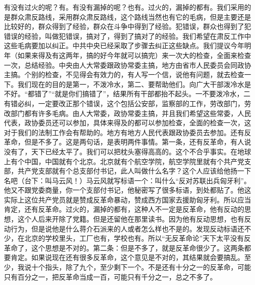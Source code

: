 有没有过火的呢？有。有没有漏掉的呢？也有。过火的，漏掉的都有。我们采用的是群众肃反路线，采用群众肃反路线，这个路线当然也有它的毛病，但是主要还是比较好的，群众得到了经验，群众在斗争中得到了经验。犯错误，群众也得到了犯错误的经验，叫做犯错误，搞对了，得到了搞对了的经验。我们希望在肃反工作中这些毛病要加以纠正。中共中央已经采取了步骤去纠正这些缺点。我们提议今年明年（如果来得及有这两年，搞的好今年就可以搞完）来一次大的检查，全面来检查一次，总结经验。中央由人大常委跟政协常委主搞，地方由省市人民委员会同政协主搞。个别的检查，不见得会有效力的，有人写一个信，说他有问题，就去检查一下。我们现在的目的是第一，不泼冷水，第二、要帮助他们。向广大干部泼冷水是不好。“都错了”“就是你们搞错了”，结果所有干部都抬不起头。一不要泼冷水，二有错必纠，一定要改正那个错误，这个包括公安部，监察部的工作，劳改部门，劳改部门都有许多毛病。由人大常委，政协常委主搞，并且我们希望这些常委，人民代表，政协委员还可以参加，具体来得及的都可以参加检查，全面的检查一次，这对于我们的法制工作会有帮助的。地方有地方人民代表跟政协委员去参加。还有反革命，但是不多了。这是两句话，是表明两件事情。第一条，还有反革命，有人说没有了，天下已经太平了。我们可以把枕头塞得高高的。这个不合乎事实。在地球上有个中国，中国就有个北京。北京就有个航空学院，航空学院里就有个共产党支部，共产党支部就有个总支部付书记，此人叫做什么名字？这个人应该给他扬一下名吧（台下：叫马云风！）马云风就写标语一个：叫什么“反对苏联出兵匈牙利”。他又不跟党委商量，你一个支部付书记，他秘密写了很多标语，到处都贴了。他这实际上这位共产党员就是赞成反革命暴动，赞成西方国家去援助匈牙利。所以应当肯定，还有反革命。过火的，漏掉的都有，这种人不一定是反革命，他有反动的思想，这个人后来开除了党籍。但是还留他在那里读书。因为他有反动思想，也有反动行为，但是说他是什么蒋介石派来的人或者怎么样也不是的。发现反动标语还不少，在北京的学校里头，工厂也有，学校也有。所以“无反革命论”天下太平没有反革命了，这个思想是不对的。第二条：但是不多了，就是反革命很少了。这两条都要肯定。如果说现在还有很多反革命，这个意见是不对的，其结果就会要搞乱。至少，我说十个指头，除了九个，至少剩下一个。不是还有十分之一的反革命，可能只有百分之一，把反革命当成一百，可能只有千分之一，总之不多了。

